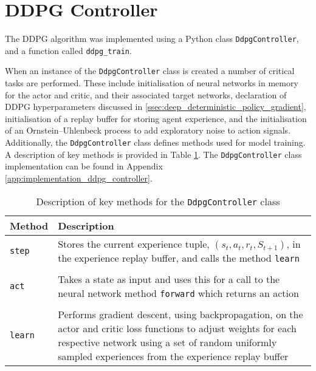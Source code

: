 \section{DDPG Controller}
The DDPG algorithm was implemented using a Python class \verb|DdpgController|, and a function called \verb|ddpg_train|.

When an instance of the \verb|DdpgController| class is created a number of critical tasks are performed. These include initialisation of neural networks in memory for the actor and critic, and their associated target networks, declaration of DDPG hyperparameters discussed in \textsection \ref{ssec:deep_deterministic_policy_gradient}, initialisation of a replay buffer for storing agent experience, and the initialisation of an Ornstein–Uhlenbeck process to add exploratory noise to action signals. Additionally, the \verb|DdpgController| class defines methods used for model training. A description of key methods is provided in Table \ref{tab:4103}. The \verb|DdpgController| class implementation can be found in Appendix \ref{app:implementation_ddpg_controller}.

\begin{table}[h]
	\centering
	\cprotect\caption{Description of key methods for the \verb|DdpgController| class}
	\begin{tabular}{lp{12cm}}
		\toprule
		\textbf{Method} & \textbf{Description} \\
		\midrule
		\verb|step| & Stores the current experience tuple, $(s_t, a_t, r_t, S_{t+1})$, in the experience replay buffer, and calls the method \verb|learn|\\
		 & \\
		\verb|act| & Takes a state as input and uses this for a call to the neural network method \verb|forward| which returns an action\\
		 & \\
		\verb|learn| & Performs gradient descent, using backpropagation, on the actor and critic loss functions to adjust weights for each respective network using a set of random uniformly sampled experiences from the experience replay buffer\\
		\bottomrule
	\end{tabular}\label{tab:4103}
\end{table}